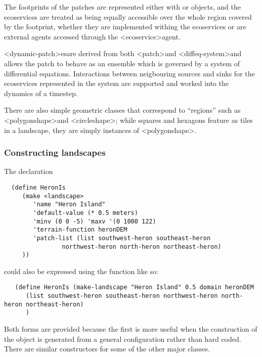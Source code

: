 \documentclass[a4]{article}
\newcommand{\rclass}[1]{\textsf{<#1>}}
\newcommand{\Function}[1]{\textbf{\slfamily{#1}}}
\newcommand{\ecoservice}[0]{\rclass{ecoservice}}
\newcommand{\patch}[0]{\rclass{patch}}
\newcommand{\dynamicpatch}[0]{\rclass{dynamic-patch}}
\newcommand{\dynamicpatches}[0]{{\dynamicpatch}es}
\newcommand{\diffeqsystem}[0]{\rclass{diffeq-system}}
\newcommand{\polygonshape}[0]{\rclass{polygonshape}}
\newcommand{\circleshape}[0]{\rclass{circleshape}}
\begin{document}
The footprints of the patches are represented either with \circle or
\polygon objects, and the ecoservices are treated as being
equally accessible over the whole region covered by the
footprint, whether they are implemented withing the ecoservices or are
external agents accessed through the \ecoservice agent.

\dynamicpatches are derived from both \patch and \diffeqsystem and
allows the patch to behave as an ensemble which is governed by a
system of differential equations. Interactions between neigbouring
sources and sinks for the ecoservices represented in the system are
supported and worked into the dynamics of a timestep.

There are also simple geometric classes that correspond to ``regions''
such as \polygonshape and \circleshape; while squares and hexagons
feature as tiles in a landscape, they are simply instances of
\polygonshape.

\subsubsection{Constructing landscapes}

The declaration
\begin{verbatim}
  (define HeronIs 
     (make <landscape>
        'name "Heron Island" 
        'default-value (* 0.5 meters)
        'minv (0 0 -5) 'maxv '(0 1000 122)
        'terrain-function heronDEM
        'patch-list (list southwest-heron southeast-heron
                northwest-heron north-heron northeast-heron)
     ))
\end{verbatim}
could also be expressed using the function \Function{make-landscape}
like so:
\begin{verbatim}
   (define HeronIs (make-landscape "Heron Island" 0.5 domain heronDEM 
      (list southwest-heron southeast-heron northwest-heron north-heron northeast-heron)
      )
\end{verbatim}

Both forms are provided because the first is more useful when the
construction of the object is generated from a general configuration
rather than hard coded.  There are similar constructors
for some of the other major classes.
\end{document}
